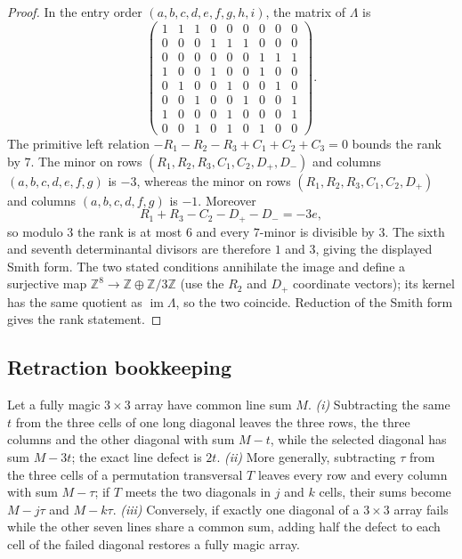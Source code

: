 \begin{proof}
In the entry order $(a,b,c,d,e,f,g,h,i)$, the matrix of $\Lambda$ is
\[
\left(\begin{array}{ccccccccc}
1&1&1&0&0&0&0&0&0\\0&0&0&1&1&1&0&0&0\\
0&0&0&0&0&0&1&1&1\\1&0&0&1&0&0&1&0&0\\
0&1&0&0&1&0&0&1&0\\0&0&1&0&0&1&0&0&1\\
1&0&0&0&1&0&0&0&1\\0&0&1&0&1&0&1&0&0
\end{array}\right).
\]
The primitive left relation
$-R_1-R_2-R_3+C_1+C_2+C_3=0$ bounds the rank by $7$. The minor on rows
$(R_1,R_2,R_3,C_1,C_2,D_+,D_-)$ and columns $(a,b,c,d,e,f,g)$ is $-3$,
whereas the minor on rows $(R_1,R_2,R_3,C_1,C_2,D_+)$ and columns
$(a,b,c,d,f,g)$ is $-1$. Moreover
\[
R_1+R_3-C_2-D_+-D_-=-3e,
\]
so modulo $3$ the rank is at most $6$ and every $7$-minor is divisible by
$3$. The sixth and seventh determinantal divisors are therefore $1$ and
$3$, giving the displayed Smith form. The two stated conditions annihilate
the image and define a surjective map
$\mathbb Z^8\to\mathbb Z\oplus\mathbb Z/3\mathbb Z$ (use the $R_2$ and
$D_+$ coordinate vectors); its kernel has the same quotient as
$\operatorname{im}\Lambda$, so the two coincide. Reduction of the Smith
form gives the rank statement.
\end{proof}


\subsection{Retraction bookkeeping}

\begin{lemma}\label{lem:retraction}
Let a fully magic $3\times3$ array have common line sum $M$.
\emph{(i)} Subtracting the same $t$ from the three cells of one long
diagonal leaves the three rows, the three columns and the other diagonal
with sum $M-t$, while the selected diagonal has sum $M-3t$; the exact line
defect is $2t$.
\emph{(ii)} More generally, subtracting $\tau$ from the three cells of a
permutation transversal $T$ leaves every row and every column with sum
$M-\tau$; if $T$ meets the two diagonals in $j$ and $k$ cells, their sums
become $M-j\tau$ and $M-k\tau$.
\emph{(iii)} Conversely, if exactly one diagonal of a $3\times3$ array
fails while the other seven lines share a common sum, adding half the
defect to each cell of the failed diagonal restores a fully magic array.
\end{lemma}

